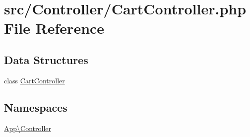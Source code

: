 \hypertarget{_cart_controller_8php}{}\section{src/\+Controller/\+Cart\+Controller.php File Reference}
\label{_cart_controller_8php}
\subsection*{Data Structures}
\begin{DoxyCompactItemize}
\item 
class \mbox{\hyperlink{class_app_1_1_controller_1_1_cart_controller}{Cart\+Controller}}
\end{DoxyCompactItemize}
\subsection*{Namespaces}
\begin{DoxyCompactItemize}
\item 
 \mbox{\hyperlink{namespace_app_1_1_controller}{App\textbackslash{}\+Controller}}
\end{DoxyCompactItemize}
